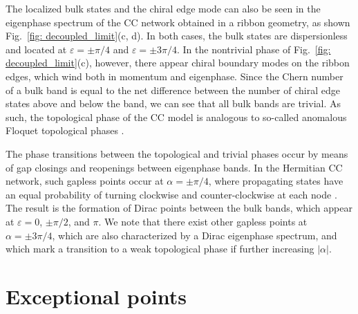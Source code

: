 \documentclass[aps,pra,reprint,superscriptaddress,showkeys,amsmath,amssymb,longbibliography]{revtex4-1}
\begin{document}
The localized bulk states and the chiral edge mode can also be seen in the eigenphase spectrum of the CC network obtained in a ribbon geometry, as shown Fig.~\ref{fig: decoupled_limit}(c, d). 
In both cases, the bulk states are dispersionless and located at $\varepsilon = \pm\pi/4$ and $\varepsilon=\pm3\pi/4$. 
In the nontrivial phase of  Fig.~\ref{fig: decoupled_limit}(c), however, there appear chiral boundary modes on the ribbon edges, which wind both in momentum and eigenphase. 
Since the Chern number of a bulk band is equal to the net difference between the number of chiral edge states above and below the band, we can see that all bulk bands are trivial.
As such, the topological phase of the CC model is analogous to so-called anomalous Floquet topological phases \cite{Rudner_PRX, Titum_PRX, Maczewsky2017, Mukherjee2017}.

The phase transitions between the topological and trivial phases occur by means of gap closings and reopenings between eigenphase bands.
In the Hermitian CC network, such gapless points occur at $\alpha=\pm\pi/4$, where propagating states have an equal probability of turning clockwise and counter-clockwise at each node \cite{Chalker1988, KRAMER2005211}.
The result is the formation of Dirac points between the bulk bands, which appear at $\varepsilon=0$, $\pm\pi/2$, and $\pi$.
We note that there exist other gapless points at $\alpha=\pm3\pi/4$, which are also characterized by a Dirac eigenphase spectrum, and which mark a transition to a weak topological phase if further increasing $|\alpha|$. 

\section{Exceptional points}
\label{sec:ep}
\end{document}
